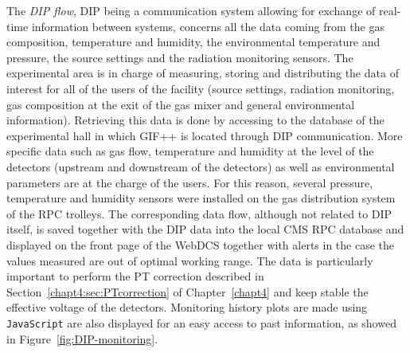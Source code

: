 	The \textit{DIP flow}, DIP being a communication system allowing for exchange of real-time information between systems, concerns all the data coming from the gas composition, temperature and humidity, the environmental temperature and pressure, the source settings and the radiation monitoring sensors. The experimental area is in charge of measuring, storing and distributing the data of interest for all of the users of the facility (source settings, radiation monitoring, gas composition at the exit of the gas mixer and general environmental information). Retrieving this data is done by accessing to the database of the experimental hall in which GIF++ is located through DIP communication. More specific data such as gas flow, temperature and humidity at the level of the detectors (upstream and downstream of the detectors) as well as environmental parameters are at the charge of the users. For this reason, several pressure, temperature and humidity sensors were installed on the gas distribution system of the RPC trolleys. The corresponding data flow, although not related to DIP itself, is saved together with the DIP data into the local CMS RPC database and displayed on the front page of the WebDCS together with alerts in the case the values measured are out of optimal working range. The data is particularly important to perform the PT correction described in Section~\ref{chapt4:sec:PTcorrection} of Chapter~\ref{chapt4} and keep stable the effective voltage of the detectors. Monitoring history plots are made using \texttt{JavaScript} are also displayed for an easy access to past information, as showed in Figure~\ref{fig:DIP-monitoring}.

